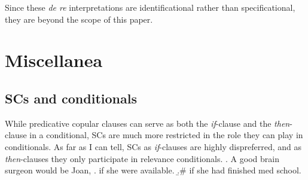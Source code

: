 \documentclass[letterpaper]{article}
\begin{document}
Since these \textit{de re} interpretations are identificational rather than specificational, they are beyond the scope of this paper.

\section{Miscellanea}
\subsection{SCs and conditionals}
While predicative copular clauses can serve as both the \textit{if}-clause and the \textit{then}-clause in a conditional, SCs are much more restricted in the role they can play in conditionals.
As far as I can tell, SCs as \textit{if}-clauses are highly dispreferred, and as \textit{then}-clauses they only participate in relevance conditionals.
\ex. A good brain surgeon would be Joan,
\a. if she were available.
\b.\# if she had finished med school.

\printbibliography
\end{document}
